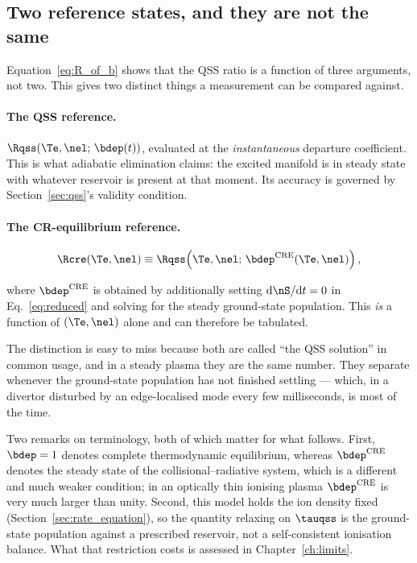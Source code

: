 \subsection{Two reference states, and they are not the same}

Equation~\eqref{eq:R_of_b} shows that the QSS ratio is a function of three
arguments, not two. This gives two distinct things a measurement can be compared
against.

\paragraph{The QSS reference.} $\Rqss(\Te, \nel;\,\bdep(t))$, evaluated at the
\emph{instantaneous} departure coefficient. This is what adiabatic elimination
claims: the excited manifold is in steady state with whatever reservoir is
present at that moment. Its accuracy is governed by
Section~\ref{sec:qss}'s validity condition.

\paragraph{The CR-equilibrium reference.}
\begin{equation}
  \Rcre(\Te, \nel)
  \equiv \Rqss\!\left(\Te, \nel;\,\bdep^{\mathrm{CRE}}(\Te,\nel)\right),
  \label{eq:cre_ratio}
\end{equation}

\noindent where $\bdep^{\mathrm{CRE}}$ is obtained by additionally setting
$\mathrm{d}\nS/\mathrm{d}t = 0$ in Eq.~\eqref{eq:reduced} and solving for the
steady ground-state population. This \emph{is} a function of $(\Te,\nel)$ alone
and can therefore be tabulated.

The distinction is easy to miss because both are called ``the QSS solution'' in
common usage, and in a steady plasma they are the same number. They separate
whenever the ground-state population has not finished settling --- which, in a
divertor disturbed by an edge-localised mode every few milliseconds, is most of
the time.

Two remarks on terminology, both of which matter for what follows. First,
$\bdep = 1$ denotes complete thermodynamic equilibrium, whereas
$\bdep^{\mathrm{CRE}}$ denotes the steady state of the collisional--radiative
system, which is a different and much weaker condition; in an optically thin
ionising plasma $\bdep^{\mathrm{CRE}}$ is very much larger than unity. Second,
this model holds the ion density fixed (Section~\ref{sec:rate_equation}), so
the quantity relaxing on $\tauqss$ is the ground-state population against a
prescribed reservoir, not a self-consistent ionisation balance. What that
restriction costs is assessed in Chapter~\ref{ch:limits}.

